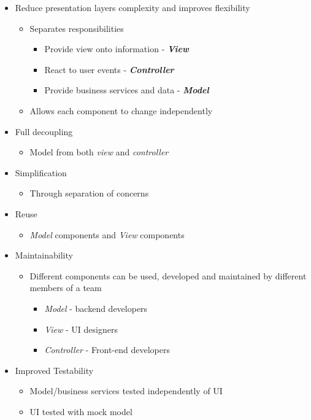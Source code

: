 \documentclass[a4paper,12pt]{article}
\begin{document}
	\begin{itemize}
		\item Reduce presentation layers complexity and  improves flexibility
			\begin{itemize}
				\item Separates responsibilities
					\begin{itemize}
						\item Provide view onto information -\textbf{\textit{ View}}
						\item React to user events - \textbf{\textit{Controller}}
						\item Provide business services  and data - \textbf{\textit{Model}}
					\end{itemize}
				\item Allows each component to change independently
			\end{itemize}
		\item Full decoupling
			\begin{itemize}
				\item Model from both \textit{view} and \textit{controller}
			\end{itemize}
		\item Simplification
			\begin{itemize}
				\item Through separation of concerns
			\end{itemize}
		\item Reuse
			\begin{itemize}
				\item \textit{Model} components and \textit{View} components 
			\end{itemize}
		\item Maintainability
			\begin{itemize}
				\item Different components can be used, developed and maintained by different members of a team
					\begin{itemize}
						\item \textit{Model} - backend developers
						\item \textit{View} - UI designers
						\item \textit{Controller} - Front-end developers
					\end{itemize}
			\end{itemize}
		\item Improved Testability
			\begin{itemize}
				\item Model/business services tested independently of UI
				\item UI tested with mock model
			\end{itemize}
	\end{itemize}
\end{document}
